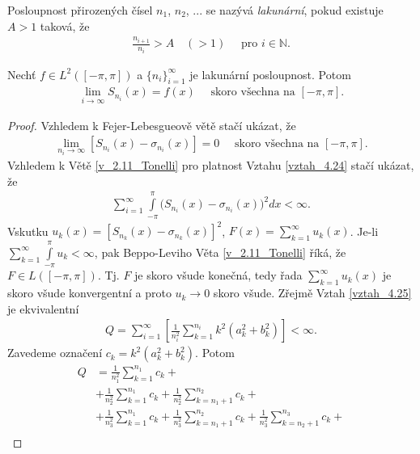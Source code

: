 \begin{definition}
\label{d_4.14.definition}
Posloupnost přirozených čísel $n_1$, $n_2$, ... se nazývá \textit{lakunární}, pokud existuje $A > 1$ taková, že
\begin{align*}
\frac{n_{i+1}}{n_i} > A \quad (> 1) \quad \textrm{ pro } i \in \mathbb{N}.
\end{align*}
\end{definition}

\begin{theorem}[Kolmogorov]\label{vztah_4.15.Kolmogorov}
Nechť $f \in L^2([-\pi, \pi])$ a $\{ n_i \}_{i=1}^{\infty}$ je lakunární posloupnost. Potom
\begin{align*}
\lim_{i \rightarrow \infty} S_{n_i} (x) = f(x) \quad \textrm{ skoro všechna na } [-\pi, \pi].
\end{align*}
\begin{proof}
Vzhledem k Fejer-Lebesgueově větě stačí ukázat, že
\begin{align}\label{vztah_4.24}
\lim_{n_i \rightarrow \infty} [S_{n_i} (x) - \sigma_{n_i} (x)] = 0 \quad \textrm{ skoro všechna na } [-\pi, \pi].
\end{align}
Vzhledem k Větě \ref{v_2.11_Tonelli} pro platnost Vztahu \eqref{vztah_4.24} stačí ukázat, že
\begin{align}\label{vztah_4.25}
\sum \limits _{i=1}^{\infty} \int \limits_{-\pi}^\pi \big(S_{n_i} (x) - \sigma_{n_i} (x)\big)^2 dx < \infty.
\end{align}
Vskutku $u_k (x) = [S_{n_k} (x) - \sigma_{n_k} (x)]^2$, $F (x) = \sum \limits _{k=1}^\infty u_k (x)$. Je-li $\sum \limits _{k=1}^{\infty} \int \limits _{-\pi}^{\pi} u_k < \infty$, pak Beppo-Leviho Věta \ref{v_2.11_Tonelli} říká, že $F \in L([-\pi, \pi])$. Tj. $F$ je skoro všude konečná, tedy řada $\sum \limits _{k=1}^\infty u_k (x)$ je skoro všude konvergentní a proto $u_k \rightarrow 0$ skoro všude. Zřejmě Vztah \eqref{vztah_4.25} je ekvivalentní
\begin{align*}
Q = \sum \limits _{i=1}^\infty \left[ \frac{1}{n_i^2} \sum \limits _{k=1}^{n_i} k^2 (a_k^2 + b_k^2) \right] < \infty.
\end{align*}
Zavedeme označení $c_k = k^2 (a_k^2 + b_k^2)$. Potom
\begin{align*}
Q &= \frac{1}{n_1^2} \sum \limits _{k=1}^{n_1} c_k + \\
&+ \frac{1}{n_2^2} \sum \limits _{k=1}^{n_1} c_k + \frac{1}{n_2^2} \sum \limits _{k=n_1 + 1}^{n_2} c_k +\\
&+ \frac{1}{n_3^2} \sum \limits _{k=1}^{n_1} c_k + \frac{1}{n_3^2} \sum \limits _{k=n_1 + 1}^{n_2} c_k + \frac{1}{n_3^2} \sum \limits _{k=n_2 + 1}^{n_3} c_k +\\

\end{align*}
\end{proof}
\end{theorem}
